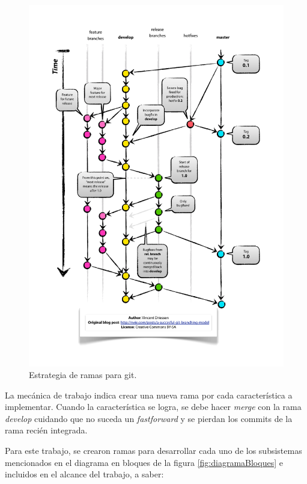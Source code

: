 \begin{figure}[!htbp]
	\centering
	\includegraphics[width=\textwidth]{./Figures/Git-branching-model.pdf}
	\caption[Estrategia de ramas para git]{Estrategia de ramas para git\protect\footnotemark.}
	\label{fig:branching}
\end{figure}


La mecánica de trabajo indica crear una nueva rama por cada característica a implementar.  Cuando la característica se logra, se debe hacer \textit{merge} con la rama \textit{develop} cuidando que no suceda un \textit{fastforward} y se pierdan los commits de la rama recién integrada.

Para este trabajo, se crearon ramas para desarrollar cada uno de los subsistemas mencionados en el diagrama en bloques de la figura \ref{fig:diagramaBloques} e incluidos en el alcance del trabajo, a saber:

